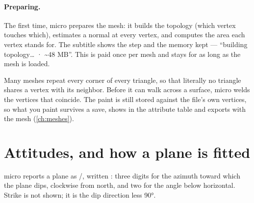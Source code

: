 \paragraph{Preparing.} The first time, micro prepares the mesh: it builds the topology (which vertex touches which), estimates a normal at every vertex, and computes the area each vertex stands for. The subtitle shows the step and the memory kept — “building topology… · \textasciitilde 48 MB”. This is paid once per mesh and stays for as long as the mesh is loaded.

\begin{why}
Many meshes repeat every corner of every triangle, so that literally no triangle shares a vertex with its neighbor. Before it can walk across a surface, micro welds the vertices that coincide. The paint is still stored against the file's own vertices, so what you paint survives a save, shows in the attribute table and exports with the mesh (\cref{ch:meshes}).
\end{why}

\section{Attitudes, and how a plane is fitted}\label{sec:structure-attitude}

micro reports a plane as /, written : three digits for the azimuth toward which the plane dips, clockwise from north, and two for the angle below horizontal. Strike is not shown; it is the dip direction less 90°.

